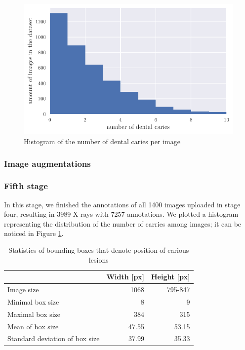 \begin{figure}
    \includegraphics[width=0.9\linewidth]{images/caries_histogram.pdf}
    \caption{Histogram of the number of dental caries per image}
    \label{fig:hist_caries_per_img}
\end{figure}
\subsubsection{Image augmentations}

\subsubsection{Fifth stage}
\label{sec:dataset:fifth_stage}
In this stage, we finished the annotations of all 1400 images uploaded in stage four, resulting in 3989 X-rays with 7257 annotations. We plotted a histogram representing the distribution of the number of carries among images; it can be noticed in Figure \ref{fig:hist_caries_per_img}.


\begin{table}
    \centering
    \begin{tabular}{|l|r|r|}
        \hline
                                       & Width [px] & Height [px] \\\hline
        Image size                     & 1068       & 795-847     \\ \hline
        Minimal box size               & 8          & 9           \\ \hline
        Maximal box size               & 384        & 315         \\ \hline
        Mean of box size               & 47.55      & 53.15       \\ \hline
        Standard deviation of box size & 37.99      & 35.33       \\ \hline
    \end{tabular}
    \caption{\label{tab:dataset_statistics}Statistics of bounding boxes that denote position of carious lesions}
\end{table}

